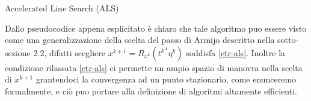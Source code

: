\documentclass[a4paper, 12pt]{article}
\begin{document}
\begin{center}
\begin{algorithm}[H]
\SetAlgoLined
{}
\caption{Accelerated Line Search (ALS)}
\end{algorithm}
\end{center}
Dallo pseudocodice appena esplicitato è chiaro che tale algoritmo puo essere visto come una generalizzazione della scelta del passo di Armijo descritto nella sotto-sezione 2.2, difatti scegliere $x^{k+1} = R_{x^k}(t^{k^A}\eta^k)$ soddisfa \eqref{ctr-als}. Inoltre la condizione rilassata \eqref{ctr-als} ci permette un ampio spazio di manovra nella scelta di $x^{k+1}$ grantendoci la convergenza ad un punto stazionario, come enunceremo formalmente, e ciò puo portare alla definizione di algoritmi altamente efficienti.
\end{document}
